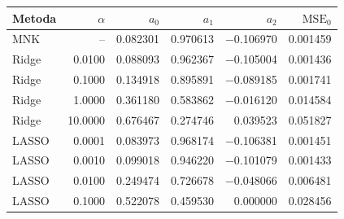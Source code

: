 \begin{tabular}{lrrrrr}
\toprule
Metoda & $\alpha$ & $a_0$ & $a_1$ & $a_2$ & $\mathrm{MSE}_0$ \\
\midrule
MNK & -- & \num{0.082301} & \num{0.970613} & \num{-0.106970} & \num{0.001459} \\
Ridge & \num{0.0100} & \num{0.088093} & \num{0.962367} & \num{-0.105004} & \num{0.001436} \\
Ridge & \num{0.1000} & \num{0.134918} & \num{0.895891} & \num{-0.089185} & \num{0.001741} \\
Ridge & \num{1.0000} & \num{0.361180} & \num{0.583862} & \num{-0.016120} & \num{0.014584} \\
Ridge & \num{10.0000} & \num{0.676467} & \num{0.274746} & \num{0.039523} & \num{0.051827} \\
LASSO & \num{0.0001} & \num{0.083973} & \num{0.968174} & \num{-0.106381} & \num{0.001451} \\
LASSO & \num{0.0010} & \num{0.099018} & \num{0.946220} & \num{-0.101079} & \num{0.001433} \\
LASSO & \num{0.0100} & \num{0.249474} & \num{0.726678} & \num{-0.048066} & \num{0.006481} \\
LASSO & \num{0.1000} & \num{0.522078} & \num{0.459530} & \num{0.000000} & \num{0.028456} \\
\bottomrule
\end{tabular}
